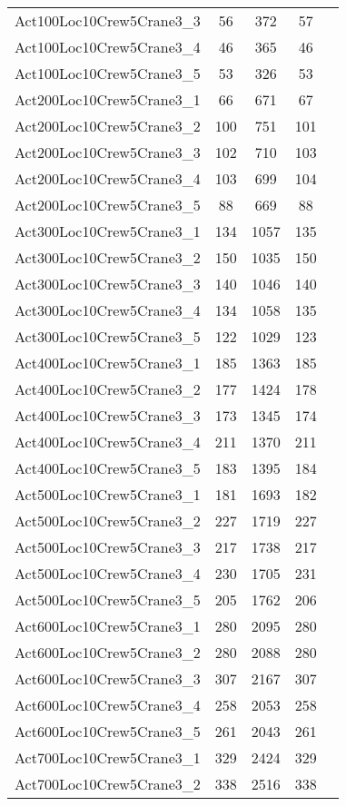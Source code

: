 {\begin{center}
\begin{longtable}{ | l | c | c | c | c | }
Act100Loc10Crew5Crane3\_3	&	56	&	372	&	57	\\
Act100Loc10Crew5Crane3\_4	&	46	&	365	&	46	\\
Act100Loc10Crew5Crane3\_5	&	53	&	326	&	53	\\
Act200Loc10Crew5Crane3\_1	&	66	&	671	&	67	\\
Act200Loc10Crew5Crane3\_2	&	100	&	751	&	101	\\
Act200Loc10Crew5Crane3\_3	&	102	&	710	&	103	\\
Act200Loc10Crew5Crane3\_4	&	103	&	699	&	104	\\
Act200Loc10Crew5Crane3\_5	&	88	&	669	&	88	\\
Act300Loc10Crew5Crane3\_1	&	134	&	1057	&	135	\\
Act300Loc10Crew5Crane3\_2	&	150	&	1035	&	150	\\
Act300Loc10Crew5Crane3\_3	&	140	&	1046	&	140	\\
Act300Loc10Crew5Crane3\_4	&	134	&	1058	&	135	\\
Act300Loc10Crew5Crane3\_5	&	122	&	1029	&	123	\\
Act400Loc10Crew5Crane3\_1	&	185	&	1363	&	185	\\
Act400Loc10Crew5Crane3\_2	&	177	&	1424	&	178	\\
Act400Loc10Crew5Crane3\_3	&	173	&	1345	&	174	\\
Act400Loc10Crew5Crane3\_4	&	211	&	1370	&	211	\\
Act400Loc10Crew5Crane3\_5	&	183	&	1395	&	184	\\
Act500Loc10Crew5Crane3\_1	&	181	&	1693	&	182	\\
Act500Loc10Crew5Crane3\_2	&	227	&	1719	&	227	\\
Act500Loc10Crew5Crane3\_3	&	217	&	1738	&	217	\\
Act500Loc10Crew5Crane3\_4	&	230	&	1705	&	231	\\
Act500Loc10Crew5Crane3\_5	&	205	&	1762	&	206	\\
Act600Loc10Crew5Crane3\_1	&	280	&	2095	&	280	\\
Act600Loc10Crew5Crane3\_2	&	280	&	2088	&	280	\\
Act600Loc10Crew5Crane3\_3	&	307	&	2167	&	307	\\
Act600Loc10Crew5Crane3\_4	&	258	&	2053	&	258	\\
Act600Loc10Crew5Crane3\_5	&	261	&	2043	&	261	\\
Act700Loc10Crew5Crane3\_1	&	329	&	2424	&	329	\\
Act700Loc10Crew5Crane3\_2	&	338	&	2516	&	338	\\

\end{longtable}
\end{center}}
